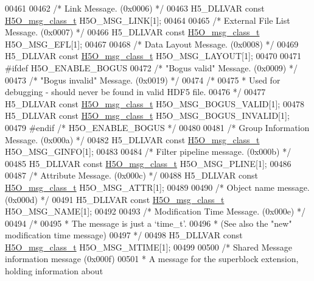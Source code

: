 \begin{DoxyCode}
00461 
00462 \textcolor{comment}{/* Link Message. (0x0006) */}
00463 H5\_DLLVAR \textcolor{keyword}{const} \hyperlink{struct_h5_o__msg__class__t}{H5O\_msg\_class\_t} H5O\_MSG\_LINK[1];
00464 
00465 \textcolor{comment}{/* External File List Message. (0x0007) */}
00466 H5\_DLLVAR \textcolor{keyword}{const} \hyperlink{struct_h5_o__msg__class__t}{H5O\_msg\_class\_t} H5O\_MSG\_EFL[1];
00467 
00468 \textcolor{comment}{/* Data Layout Message. (0x0008) */}
00469 H5\_DLLVAR \textcolor{keyword}{const} \hyperlink{struct_h5_o__msg__class__t}{H5O\_msg\_class\_t} H5O\_MSG\_LAYOUT[1];
00470 
00471 \textcolor{preprocessor}{#ifdef H5O\_ENABLE\_BOGUS}
00472 \textcolor{comment}{/* "Bogus valid" Message. (0x0009) */}
00473 \textcolor{comment}{/* "Bogus invalid" Message. (0x0019) */}
00474 \textcolor{comment}{/*}
00475 \textcolor{comment}{ * Used for debugging - should never be found in valid HDF5 file.}
00476 \textcolor{comment}{ */}
00477 H5\_DLLVAR \textcolor{keyword}{const} \hyperlink{struct_h5_o__msg__class__t}{H5O\_msg\_class\_t} H5O\_MSG\_BOGUS\_VALID[1];
00478 H5\_DLLVAR \textcolor{keyword}{const} \hyperlink{struct_h5_o__msg__class__t}{H5O\_msg\_class\_t} H5O\_MSG\_BOGUS\_INVALID[1];
00479 \textcolor{preprocessor}{#endif }\textcolor{comment}{/* H5O\_ENABLE\_BOGUS */}\textcolor{preprocessor}{}
00480 
00481 \textcolor{comment}{/* Group Information Message. (0x000a) */}
00482 H5\_DLLVAR \textcolor{keyword}{const} \hyperlink{struct_h5_o__msg__class__t}{H5O\_msg\_class\_t} H5O\_MSG\_GINFO[1];
00483 
00484 \textcolor{comment}{/* Filter pipeline message. (0x000b) */}
00485 H5\_DLLVAR \textcolor{keyword}{const} \hyperlink{struct_h5_o__msg__class__t}{H5O\_msg\_class\_t} H5O\_MSG\_PLINE[1];
00486 
00487 \textcolor{comment}{/* Attribute Message. (0x000c) */}
00488 H5\_DLLVAR \textcolor{keyword}{const} \hyperlink{struct_h5_o__msg__class__t}{H5O\_msg\_class\_t} H5O\_MSG\_ATTR[1];
00489 
00490 \textcolor{comment}{/* Object name message. (0x000d) */}
00491 H5\_DLLVAR \textcolor{keyword}{const} \hyperlink{struct_h5_o__msg__class__t}{H5O\_msg\_class\_t} H5O\_MSG\_NAME[1];
00492 
00493 \textcolor{comment}{/* Modification Time Message. (0x000e) */}
00494 \textcolor{comment}{/*}
00495 \textcolor{comment}{ * The message is just a `time\_t'.}
00496 \textcolor{comment}{ * (See also the "new" modification time message)}
00497 \textcolor{comment}{ */}
00498 H5\_DLLVAR \textcolor{keyword}{const} \hyperlink{struct_h5_o__msg__class__t}{H5O\_msg\_class\_t} H5O\_MSG\_MTIME[1];
00499 
00500 \textcolor{comment}{/* Shared Message information message (0x000f)}
00501 \textcolor{comment}{ * A message for the superblock extension, holding information about}

\end{DoxyCode}
